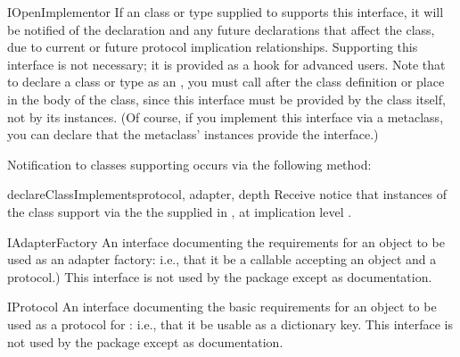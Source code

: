 \begin{verbatim%
}
\begin{verbatim%
}
\begin{verbatim%
}
\begin{verbatim%
}
\begin{verbatim%
}
\begin{verbatim%
}
\begin{classdesc*}{IOpenImplementor}
If an class or type supplied to  supports
this interface, it will be notified of the declaration and any future
declarations that affect the class, due to current or future protocol
implication relationships.  Supporting this interface is not necessary; it is
provided as a hook for advanced users.  Note that to declare a class or type
as an , you must call  after the class definition or place
 in the body of the class, since
this interface must be provided by the class itself, not by its instances.  (Of
course, if you implement this interface via a metaclass, you can declare that
the metaclass' instances provide the interface.)

Notification to classes supporting  occurs via the
following method:

\begin{methoddesc}{declareClassImplements}{protocol, adapter, depth}
Receive notice that instances of the class support  via the
the  supplied in , at implication level
.
\end{methoddesc}

\end{classdesc*}


















\begin{classdesc*}{IAdapterFactory}
An interface documenting the requirements for an object to be used as an
adapter factory: i.e., that it be a callable accepting an object and a
protocol.)  This interface is not used by the  package except
as documentation.
\end{classdesc*}


\begin{classdesc*}{IProtocol}
An interface documenting the basic requirements for an object to be used as
a protocol for : i.e., that it be usable as a dictionary
key.  This interface is not used by the  package except as
documentation.
\end{classdesc*}



\end{verbatim%
}
\end{verbatim%
}
\end{verbatim%
}
\end{verbatim%
}
\end{verbatim%
}
\end{verbatim%
}
